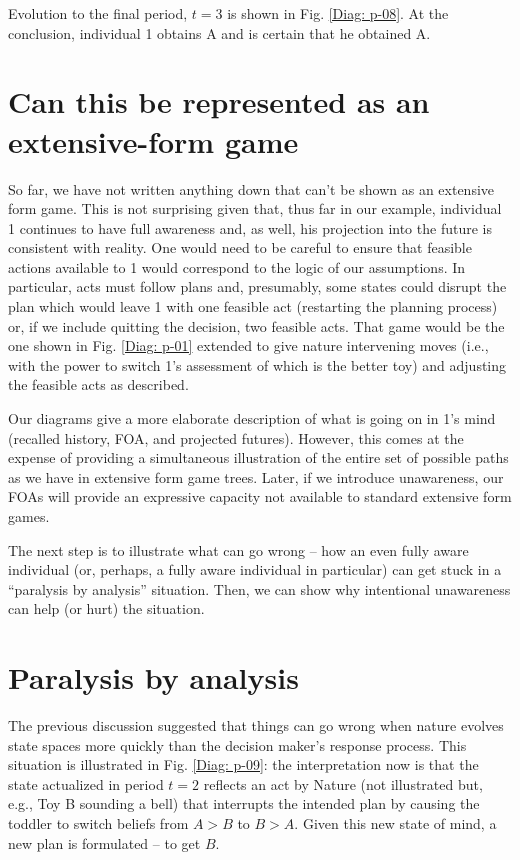\documentclass[
11pt,
titlepage,
reqno,
]{article}%
\theoremstyle{definition}
\begin{document}
Evolution to the final period, $t=3$ is shown in Fig. \ref{Diag: p-08}. At the conclusion, individual 1 obtains A and is certain that he obtained A. 

\section*{Can this be represented as an extensive-form game}

So far, we have not written anything down that can't be shown as an extensive form game. This is not surprising given that, thus far in our example, individual 1 continues to have full awareness and, as well, his projection into the future is consistent with reality. One would need to be careful to ensure that feasible actions available to 1 would correspond to the logic of our assumptions. In particular, acts must follow plans and, presumably, some states could disrupt the plan which would leave 1 with one feasible act (restarting the planning process) or, if we include quitting the decision, two feasible acts. That game would be the one shown in Fig. \ref{Diag: p-01} extended to give nature intervening moves (i.e., with the power to switch 1's assessment of which is the better toy) and adjusting the feasible acts as described.

Our diagrams give a more elaborate description of what is going on in 1's mind (recalled history, FOA, and projected futures). However, this comes at the expense of providing a simultaneous illustration of the entire set of possible paths as we have in extensive form game trees. Later, if we introduce unawareness, our FOAs will provide an expressive capacity not available to standard extensive form games. 

The next step is to illustrate what can go wrong -- how an even fully aware individual (or, perhaps, a fully aware individual in particular) can get stuck in a ``paralysis by analysis'' situation. Then, we can show why intentional unawareness can help (or hurt) the situation.

\section*{Paralysis by analysis}
The previous discussion suggested that things can go wrong when nature evolves state spaces more quickly than the decision maker's response process. This situation is illustrated in Fig. \ref{Diag: p-09}: the interpretation now is that the state actualized in period $t=2$ reflects an act by Nature (not illustrated but, e.g., Toy B sounding a bell) that interrupts the intended plan by causing the toddler to switch beliefs from $A>B$ to $B>A$. Given this new state of mind, a new plan is formulated -- to get $B$.
\end{document}
